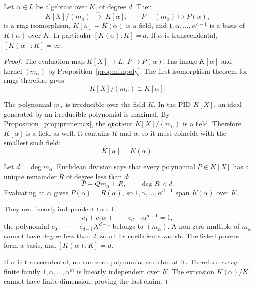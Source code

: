 \begin{theorem}\label{thm:simple}
Let $\alpha\in L$ be algebraic over $K$, of degree $d$. Then
\[
K[X]/(m_\alpha)\;\xrightarrow{\ \sim\ }\;K[\alpha],\qquad P+(m_\alpha)\mapsto P(\alpha),
\]
is a ring isomorphism, $K[\alpha]=K(\alpha)$ is a field, and $1,\alpha,\dots,\alpha^{d-1}$ is a basis of $K(\alpha)$ over $K$. In particular $[K(\alpha):K]=d$. If $\alpha$ is transcendental, $[K(\alpha):K]=\infty$.
\end{theorem}
\begin{proof}
The evaluation map $K[X]\to L$,
$P\mapsto P(\alpha)$, has image
$K[\alpha]$ and kernel $(m_\alpha)$
by Proposition~\ref{prop:minpoly}.
The first isomorphism theorem for rings
therefore gives
\[
K[X]/(m_\alpha)\cong K[\alpha].
\]

The polynomial $m_\alpha$ is irreducible
over the field $K$. In the PID $K[X]$,
an ideal generated by an irreducible
polynomial is maximal. By
Proposition~\ref{prop:primemax},
the quotient $K[X]/(m_\alpha)$
is a field. Therefore $K[\alpha]$
is a field as well. It contains $K$
and $\alpha$, so it must coincide
with the smallest such field:
\[
K[\alpha]=K(\alpha).
\]

Let $d=\deg m_\alpha$. Euclidean
division says that every polynomial
$P\in K[X]$ has a unique remainder
$R$ of degree less than $d$:
\[
P=Qm_\alpha+R,\qquad\deg R<d.
\]
Evaluating at $\alpha$ gives
$P(\alpha)=R(\alpha)$, so
$1,\alpha,\ldots,\alpha^{d-1}$
span $K(\alpha)$ over $K$.

They are linearly independent too.
If
\[
c_0+c_1\alpha+\cdots+c_{d-1}\alpha^{d-1}=0,
\]
the polynomial $c_0+\cdots+c_{d-1}X^{d-1}$
belongs to $(m_\alpha)$.
A non-zero multiple of $m_\alpha$
cannot have degree less than $d$,
so all its coefficients vanish.
The listed powers form a basis,
and $[K(\alpha):K]=d$.

If $\alpha$ is transcendental,
no non-zero polynomial vanishes at it.
Therefore \emph{every} finite family
$1,\alpha,\ldots,\alpha^m$ is linearly
independent over $K$. The extension
$K(\alpha)/K$ cannot have finite
dimension, proving the last claim.
\end{proof}

